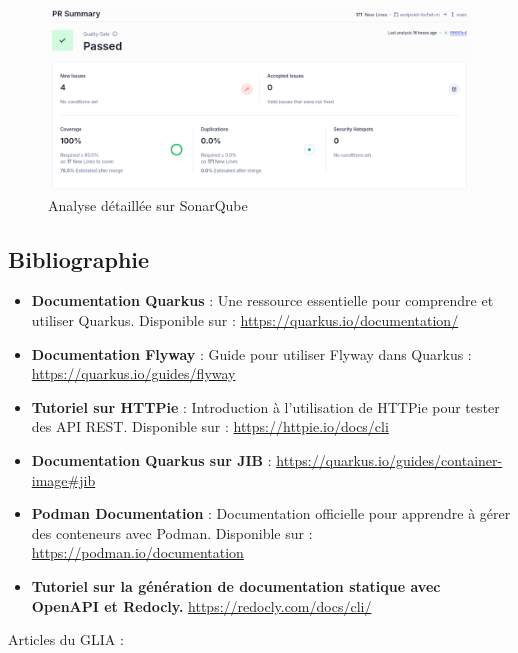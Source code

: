 \documentclass[11pt]{article}
\begin{document}
		\begin{figure}[H] \centering \includegraphics[width=\textwidth]{asset/analyse_sonarq.png} \caption{Analyse détaillée sur SonarQube} \label{fig:sonarq}\end{figure}
		\subsection{Bibliographie}
		\begin{itemize}
			\item \textbf{Documentation Quarkus} : Une ressource essentielle pour comprendre et utiliser Quarkus. Disponible sur : \url{https://quarkus.io/documentation/}
			\item \textbf{Documentation Flyway} : Guide pour utiliser Flyway dans Quarkus : \url{https://quarkus.io/guides/flyway}
			\item \textbf{Tutoriel sur HTTPie} : Introduction à l'utilisation de HTTPie pour tester des API REST. Disponible sur : \url{https://httpie.io/docs/cli}
			\item\textbf{Documentation Quarkus sur JIB} : \url{https://quarkus.io/guides/container-image#jib}
			\item \textbf{Podman Documentation} : Documentation officielle pour apprendre à gérer des conteneurs avec Podman. Disponible sur : \url{https://podman.io/documentation}
			\item \textbf{Tutoriel sur la génération de documentation statique avec OpenAPI et Redocly.} \url{https://redocly.com/docs/cli/} 
		\end{itemize}
		Articles du GLIA :
		\sloppy 
\end{document}
